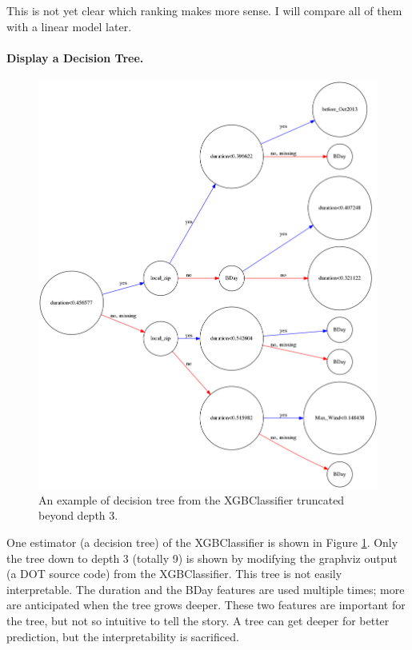\documentclass[a4paper]{article}
\begin{document}
			This is not yet clear which ranking makes more sense. I will compare all of them with a linear model later.
			
			\paragraph{Display a Decision Tree.}

			\begin{figure}
				\centering
				\includegraphics[width=1\textwidth]{xgb_tree_16.png}
				\caption{\label{fig:xgb_tree}An example of decision tree from the XGBClassifier truncated beyond depth 3.}	
			\end{figure}
			
			One estimator (a decision tree) of the XGBClassifier is shown in Figure \ref{fig:xgb_tree}. Only the tree down to depth 3 (totally 9) is shown by modifying the graphviz output (a DOT source code) from the XGBClassifier. This tree is not easily interpretable. The duration and the BDay features are used multiple times; more are anticipated when the tree grows deeper. These two features are important for the tree, but not so intuitive to tell the story. A tree can get deeper for better prediction, but the interpretability is sacrificed.
			
\end{document}
